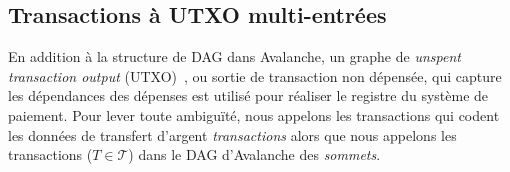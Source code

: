 \documentclass[letterpaper,twocolumn,10pt]{article}
\theoremstyle{definition}
\begin{document}
\subsection{Transactions à UTXO multi-entrées}
En addition à la structure de DAG dans Avalanche, un graphe de \emph{unspent transaction output} (UTXO)~\cite{nakamoto2008bitcoin}, ou sortie de transaction non dépensée, qui capture les dépendances des dépenses est utilisé pour réaliser le registre du système de paiement. Pour lever toute ambiguïté, nous appelons les transactions qui codent les données de transfert d'argent \emph{transactions} alors que nous appelons les transactions ($T \in \mathcal{T}$) dans le DAG d'Avalanche des \emph{sommets}.
\end{document}
